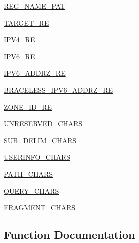 \begin{DoxyCompactItemize}
\item 
\hyperlink{namespacepip_1_1__vendor_1_1urllib3_1_1util_1_1url_a10c678fdf1dd0bb7d63168115b7fd787}{R\+E\+G\+\_\+\+N\+A\+M\+E\+\_\+\+P\+AT}
\item 
\hyperlink{namespacepip_1_1__vendor_1_1urllib3_1_1util_1_1url_a1e97029f836e60a368bbac3e862e86fd}{T\+A\+R\+G\+E\+T\+\_\+\+RE}
\item 
\hyperlink{namespacepip_1_1__vendor_1_1urllib3_1_1util_1_1url_af5308c21a66d98dd492607625466c5b7}{I\+P\+V4\+\_\+\+RE}
\item 
\hyperlink{namespacepip_1_1__vendor_1_1urllib3_1_1util_1_1url_a7e1fffd05f1925d434a2fc37ddb206ff}{I\+P\+V6\+\_\+\+RE}
\item 
\hyperlink{namespacepip_1_1__vendor_1_1urllib3_1_1util_1_1url_abc59f97100f91a6e0c929ddc333042ef}{I\+P\+V6\+\_\+\+A\+D\+D\+R\+Z\+\_\+\+RE}
\item 
\hyperlink{namespacepip_1_1__vendor_1_1urllib3_1_1util_1_1url_a1b6455a0a4d02419657f4c64d3e43a8c}{B\+R\+A\+C\+E\+L\+E\+S\+S\+\_\+\+I\+P\+V6\+\_\+\+A\+D\+D\+R\+Z\+\_\+\+RE}
\item 
\hyperlink{namespacepip_1_1__vendor_1_1urllib3_1_1util_1_1url_a73bdf444d12d7b8c74d876cb6c1271f7}{Z\+O\+N\+E\+\_\+\+I\+D\+\_\+\+RE}
\item 
\hyperlink{namespacepip_1_1__vendor_1_1urllib3_1_1util_1_1url_a18c035e3f106ec718bcb92da995d173a}{U\+N\+R\+E\+S\+E\+R\+V\+E\+D\+\_\+\+C\+H\+A\+RS}
\item 
\hyperlink{namespacepip_1_1__vendor_1_1urllib3_1_1util_1_1url_af60c8c5dfbef83aaf9827673cdcf7e9a}{S\+U\+B\+\_\+\+D\+E\+L\+I\+M\+\_\+\+C\+H\+A\+RS}
\item 
\hyperlink{namespacepip_1_1__vendor_1_1urllib3_1_1util_1_1url_a2fccc5f2d8688ae0baa9744730643485}{U\+S\+E\+R\+I\+N\+F\+O\+\_\+\+C\+H\+A\+RS}
\item 
\hyperlink{namespacepip_1_1__vendor_1_1urllib3_1_1util_1_1url_a5bbd730c9a0239a35bc58c750ad396f5}{P\+A\+T\+H\+\_\+\+C\+H\+A\+RS}
\item 
\hyperlink{namespacepip_1_1__vendor_1_1urllib3_1_1util_1_1url_a1c58564075b1840299d7348a4518c3df}{Q\+U\+E\+R\+Y\+\_\+\+C\+H\+A\+RS}
\item 
\hyperlink{namespacepip_1_1__vendor_1_1urllib3_1_1util_1_1url_a53a9011a5e064bdce2f41b0caa1980c5}{F\+R\+A\+G\+M\+E\+N\+T\+\_\+\+C\+H\+A\+RS}
\end{DoxyCompactItemize}


\subsection{Function Documentation}
\mbox{\label{namespacepip_1_1__vendor_1_1urllib3_1_1util_1_1url_ad66398d277065c1d70e0379bed1a32c3}} 
